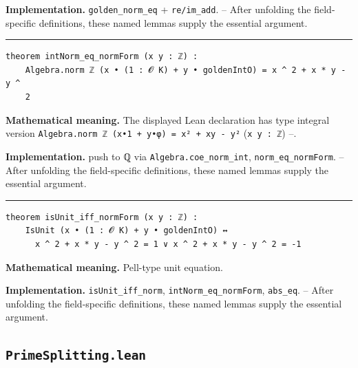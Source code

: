 \documentclass[UTF8,a4paper,11pt,fontset=fandol]{ctexart}
\theoremstyle{definition}
\newcommand{\statementsep}{\par\medskip\hrule\medskip}
\begin{document}
\noindent\textbf{Implementation.} \texttt{golden\_\allowbreak{}norm\_\allowbreak{}eq} + \texttt{re/\allowbreak{}im\_\allowbreak{}add}. -- After unfolding the field-specific definitions, these named lemmas supply the essential argument.\par
\statementsep
\begin{verbatim}
theorem intNorm_eq_normForm (x y : ℤ) :
    Algebra.norm ℤ (x • (1 : 𝓞 K) + y • goldenIntO) = x ^ 2 + x * y - y ^
    2
\end{verbatim}
\noindent\textbf{Mathematical meaning.} The displayed Lean declaration has type integral version \texttt{Algebra.\allowbreak{}norm ℤ (x•1 + y•φ) = x² + xy - y²} (\texttt{x y : ℤ}) --.\par
\noindent\textbf{Implementation.} push to ℚ via \texttt{Algebra.\allowbreak{}coe\_\allowbreak{}norm\_\allowbreak{}int}, \texttt{norm\_\allowbreak{}eq\_\allowbreak{}normForm}. -- After unfolding the field-specific definitions, these named lemmas supply the essential argument.\par
\statementsep
\begin{verbatim}
theorem isUnit_iff_normForm (x y : ℤ) :
    IsUnit (x • (1 : 𝓞 K) + y • goldenIntO) ↔
      x ^ 2 + x * y - y ^ 2 = 1 ∨ x ^ 2 + x * y - y ^ 2 = -1
\end{verbatim}
\noindent\textbf{Mathematical meaning.} Pell-type unit equation.\par
\noindent\textbf{Implementation.} \texttt{isUnit\_\allowbreak{}iff\_\allowbreak{}norm}, \texttt{intNorm\_\allowbreak{}eq\_\allowbreak{}normForm}, \texttt{abs\_\allowbreak{}eq}. -- After unfolding the field-specific definitions, these named lemmas supply the essential argument.\par

\subsection{\texttt{PrimeSplitting.lean}}
\end{document}
